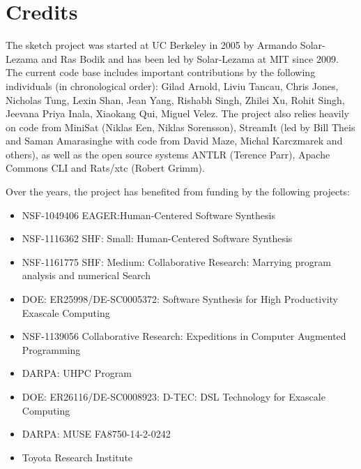 \section{Credits}

The sketch project was started at UC Berkeley in 2005 by Armando Solar-Lezama and Ras Bodik and has been led by Solar-Lezama at MIT since 2009. The current code base includes important contributions by the following individuals (in chronological order): 
Gilad Arnold,
Liviu Tancau,
Chris Jones,
Nicholas Tung,
Lexin Shan,
Jean Yang,
Rishabh Singh,
Zhilei Xu,
Rohit Singh,
Jeevana Priya Inala,
Xiaokang Qui,
Miguel Velez.
The project also relies heavily on code from MiniSat (Niklas Een, Niklas Sorensson), StreamIt (led by Bill Theis and Saman Amarasinghe with code from David Maze, Michal Karczmarek and others), as well as the open source systems ANTLR (Terence Parr), Apache Commons CLI and Rats/xtc (Robert Grimm).

Over the years, the project has benefited from funding by the following projects:
\begin{itemize}
\item NSF-1049406 EAGER:Human-Centered Software Synthesis
\item NSF-1116362  SHF: Small: Human-Centered Software Synthesis
\item NSF-1161775 SHF: Medium: Collaborative Research: Marrying program analysis and numerical Search
\item DOE: ER25998/DE-SC0005372: Software Synthesis for High Productivity Exascale Computing
\item NSF-1139056 Collaborative Research: Expeditions in Computer Augmented Programming
\item DARPA: UHPC Program
\item DOE: ER26116/DE-SC0008923: D-TEC: DSL Technology for Exascale Computing 
\item DARPA: MUSE FA8750-14-2-0242
\item Toyota Research Institute
\end{itemize}

